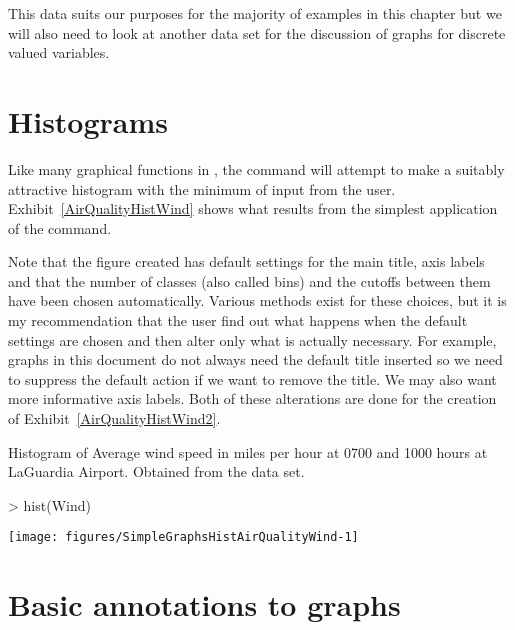 This data suits our purposes for the majority of examples in this chapter but we will also need to look at another data set for the discussion of graphs for discrete valued variables.

\section{Histograms}

Like many graphical functions in \R{}, the  command will attempt to make a suitably attractive histogram with the minimum of input from the user. Exhibit~\ref{AirQualityHistWind} shows what results from the simplest application of the  command.

Note that the figure created has default settings for the main title, axis labels and that the number of classes (also called bins) and the cutoffs between them have been chosen automatically. Various methods exist for these choices, but it is my recommendation that the user find out what happens when the default settings are chosen and then alter only what is actually necessary. For example, graphs in this document do not always need the default title inserted so we need to suppress the default action if we want to remove the title. We may also want more informative axis labels. Both of these alterations are done for the creation of Exhibit~\ref{AirQualityHistWind2}.

\begin{exhibit}
\begin{center}
\caption{Histogram of Average wind speed in miles per hour at 0700 and 1000 hours at LaGuardia Airport. Obtained from the  data set.}
\label{AirQualityHistWind}
\begin{Schunk}
\begin{Sinput}
> hist(Wind)
\end{Sinput}

\texttt{[image: figures/SimpleGraphsHistAirQualityWind-1]} \end{Schunk}
\end{center}
\end{exhibit}

\section{Basic annotations to graphs}

